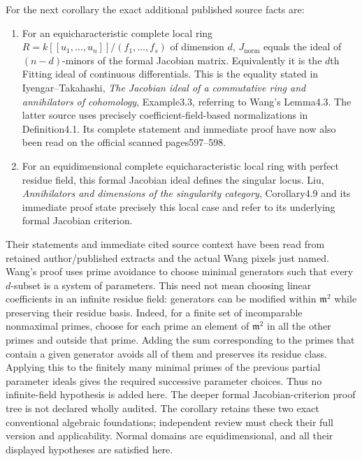 \documentclass[11pt]{article}
\begin{document}
For the next corollary the exact additional published source facts are:
\begin{enumerate}
\item For an equicharacteristic complete local ring
$R=k[[u_1,\ldots,u_n]]/(f_1,\ldots,f_s)$ of dimension $d$,
$J_{\mathrm{norm}}$ equals the ideal of $(n-d)$-minors of the formal
Jacobian matrix. Equivalently it is the $d$th Fitting ideal of continuous
differentials. This is the equality stated in Iyengar--Takahashi,
\emph{The Jacobian ideal of a commutative ring and annihilators of
cohomology}, Example3.3, referring to Wang's Lemma4.3.
The latter source uses precisely coefficient-field-based normalizations
in Definition4.1. Its complete statement and immediate proof have now
also been read on the official scanned pages597--598.
\item For an equidimensional complete equicharacteristic local ring with
perfect residue field, this formal Jacobian ideal defines the singular
locus. Liu, \emph{Annihilators and dimensions of the singularity category},
Corollary4.9 and its immediate proof state precisely this local case and
refer to its underlying formal Jacobian criterion.
\end{enumerate}
Their statements and immediate cited source context have been read from
retained author/published extracts and the actual Wang pixels just named.
Wang's proof uses prime avoidance to choose minimal generators such that
every $d$-subset is a system of parameters. This need not mean choosing
linear coefficients in an infinite residue field: generators can be
modified within $\mathfrak m^2$ while preserving their residue basis.
Indeed, for a finite set of incomparable nonmaximal primes, choose for
each prime an element of $\mathfrak m^2$ in all the other primes and
outside that prime. Adding the sum corresponding to the primes that
contain a given generator avoids all of them and preserves its residue
class. Applying this to the finitely many minimal primes of the previous
partial parameter ideals gives the required successive parameter choices.
Thus no infinite-field hypothesis is added here. The deeper formal
Jacobian-criterion proof tree is not declared wholly audited.
The corollary retains these
two exact conventional algebraic foundations; independent review must
check their full version and applicability. Normal domains are
equidimensional, and all their displayed hypotheses are satisfied here.
\end{document}
